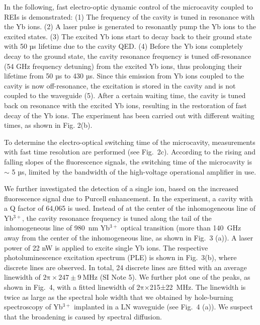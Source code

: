 \documentclass[prl,reprint,superscriptaddress]{revtex4-1}
\begin{document}
In the following, fast electro-optic dynamic control of the microcavity coupled to REIs is demonstrated: (1) The frequency of the cavity is tuned in resonance with the Yb ions. (2) A laser pulse is generated to resonantly pump the Yb ions to the excited states. (3) The excited Yb ions start to decay back to their ground state with 50 µs lifetime due to the cavity QED. (4) Before the Yb ions completely decay to the ground state, the cavity resonance frequency is tuned off-resonance (54 GHz frequency detuning) from the excited Yb ions, thus prolonging their lifetime from 50 µs  to 430 µs. Since this emission from Yb ions coupled to the cavity is now off-resonance, the excitation is stored in the cavity and is not coupled to the waveguide (5). After a certain waiting time, the cavity is tuned back on resonance with the excited Yb ions, resulting in the restoration of fast decay of the Yb ions. The experiment has been carried out with different waiting times, as shown in Fig. 2(b). 

To determine the electro-optical switching time of the microcavity, measurements with fast time resolution are performed (see Fig.~2c). According to the rising and falling slopes of the fluorescence signals, the switching time of the microcavity is $\sim$ 5 µs, limited by the bandwidth of the high-voltage operational amplifier in use.




We further investigated the detection of a single ion, based on the increased fluorescence signal due to Purcell enhancement. In the experiment, a cavity with a Q factor of 64,065 is used. Instead of at the center of the inhomogeneous line of Yb$\mathrm{^{3+}}$, the cavity resonance frequency is tuned along the tail of the inhomogeneous line of 980~nm Yb$\mathrm{^{3+}}$ optical transition (more than 140~GHz away from the center of the inhomogeneous line, as shown in  Fig.~3 (a)). A laser power of 22 nW is applied to excite single Yb ions. The respective photoluminescence excitation spectrum (PLE) is shown in Fig.~3(b), where discrete lines are observed. In total, 24 discrete lines are fitted with an average linewidth of $\mathrm{2\pi\times247\pm9~MHz}$ (SI Note 5). We further plot one of the peaks, as shown in Fig.~4, with a fitted linewidth of 2$\mathrm{\pi}$×215±22~MHz. The linewidth is twice as large as the spectral hole width that we obtained by hole-burning spectroscopy of Yb$\mathrm{^{3+}}$ implanted in a LN waveguide (see Fig.~4 (a)). We suspect that the broadening is caused by spectral diffusion. 
\end{document}
